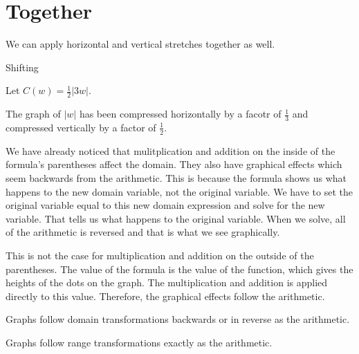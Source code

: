 \documentclass{ximera}
\begin{document}
\section{Together}

We can apply horizontal and vertical stretches together as well.





\begin{example}  Shifting

Let $C(w) = \frac{1}{2}|3w|$.


\begin{image}
\end{image}

\end{example}

The graph of $|w|$ has been compressed horizontally by a facotr of $\frac{1}{3}$ and compressed vertically by a factor of $\frac{1}{2}$.




We have already noticed that mulitplication and addition on the inside of the formula's parentheses affect the domain.  They also have graphical effects which seem backwards from the arithmetic.  This is because the formula shows us what happens to the new domain variable, not the original variable.  We have to set the original variable equal to this new domain expression and solve for the new variable.  That tells us what happens to the original variable.  When we solve, all of the arithmetic is reversed and that is what we see graphically.

This is not the case for multiplication and addition on the outside of the parentheses.  The value of the formula is the value of the function, which gives the heights of the dots on the graph.  The multiplication and addition is applied directly to this value.  Therefore, the graphical effects follow the arithmetic.


\begin{center}

Graphs follow domain transformations backwards or in reverse as the arithmetic.


\end{center}


\begin{center}

Graphs follow range transformations exactly as the arithmetic.


\end{center}
\end{document}
